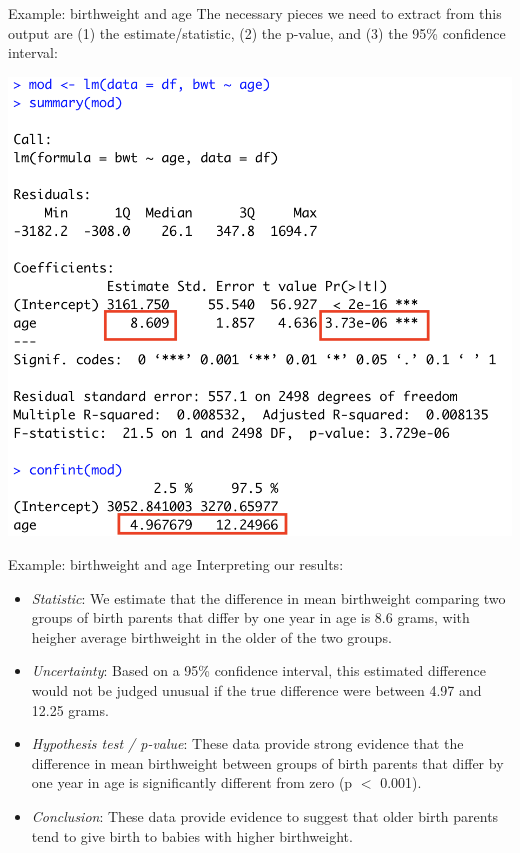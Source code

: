 \documentclass[10pt,t]{beamer}
\begin{document}
\begin{frame}{Example: birthweight and age}
The necessary pieces we need to extract from this output are (1) the estimate/statistic, (2) the p-value, and (3) the 95\% confidence interval:

\vspace{0.15cm}

\centering \includegraphics[scale=0.35]{lm_bwt_age2.png}

\end{frame}

\begin{frame}{Example: birthweight and age}
Interpreting our results:
\begin{itemize}
	\item \textit{Statistic}: We estimate that the difference in mean birthweight comparing two groups of birth parents that differ by one year in age is 8.6 grams, with heigher average birthweight in the older of the two groups. \pause
	\item \textit{Uncertainty}: Based on a 95\% confidence interval, this estimated difference would not be judged unusual if the true difference were between 4.97 and 12.25 grams. \pause
	\item \textit{Hypothesis test / p-value}: These data provide strong evidence that the difference in mean birthweight between groups of birth parents that differ by one year in age is significantly different from zero (p $<$ 0.001). \pause
	\item \textit{Conclusion}: These data provide evidence to suggest that older birth parents tend to give birth to babies with higher birthweight.
\end{itemize}
\end{frame}
\end{document}
